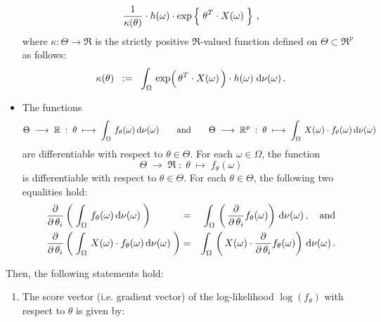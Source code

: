 \begin{theorem}
\begin{itemize}
\begin{equation*}
		\dfrac{1}{\kappa(\theta)}
		\cdot
		h(\omega)
		\cdot
		\exp\left\{\; \theta^{T} \!\overset{{\color{white}-}}{\cdot}\! X(\omega) \;\right\}\,,
	\end{equation*}
	where $\kappa : \Theta \longrightarrow \Re$ is the strictly positive
	$\Re$-valued function defined on $\Theta \subset \Re^{p}$ as follows:
	\begin{equation*}
	\kappa(\theta)
	\;\; := \;\;
		\int_{\Omega}\,
			\exp\!\left(\,\theta^{T} \!\overset{{\color{white}-}}{\cdot}\! X(\omega)\,\right) \cdot h(\omega)
		\;\d\nu(\omega)\,.
	\end{equation*}
\item
	The functions
	\begin{equation*}
	\Theta \; \longrightarrow \; \mathbb{R}
	\; : \; \theta \; \longmapsto \; \int_{\Omega}\,f_{\theta}(\omega)\,\textnormal{d}\nu(\omega)
	\quad\quad\textnormal{and}\quad\quad
	\Theta \; \longrightarrow \; \mathbb{R}^{p}
	\; : \; \theta \; \longmapsto \; \int_{\Omega}\,X(\omega) \cdot f_{\theta}(\omega)\,\textnormal{d}\nu(\omega)
	\end{equation*}
	are differentiable with respect to $\theta \in \Theta$.
	For each $\omega \in \Omega$, the function
	\begin{equation*}
	\Theta \; \longrightarrow \; \Re
	\; : \; \theta \; \longmapsto \; f_{\theta}(\omega)
	\end{equation*}
	is differentiable with respect to $\theta \in \Theta$.
	For each $\theta \in \Theta$, the following two equalities hold:
	\begin{eqnarray*}
	\dfrac{\partial}{\partial\,\theta_{i}} \left(\; \int_{\Omega}\,f_{\theta}(\omega)\,\d\nu(\omega) \;\right)
	{\color{white}\;\cdot X(\omega)}
	&=&
	\int_{\Omega}\, \left(\,\dfrac{\partial}{\partial\,\theta_{i}} f_{\theta}(\omega)\right) \,\d\nu(\omega)\,,
	\quad\textnormal{and}
	\\
	\dfrac{\partial}{\partial\,\theta_{i}} \left(\; \int_{\Omega}\,X(\omega) \cdot f_{\theta}(\omega)\,\d\nu(\omega) \;\right)
	&=&
	\int_{\Omega}\, \left(\,X(\omega) \cdot \dfrac{\partial}{\partial\,\theta_{i}} f_{\theta}(\omega)\right) \,\d\nu(\omega)\,.
	\end{eqnarray*}
\end{itemize}
Then, the following statements hold:
\begin{enumerate}
\item\label{formulaScoreVector}
	The score vector (i.e. gradient vector) of the log-likelihood $\log(f_{\theta})$ with respect to $\theta$ is given by:
	\begin{equation*}

\end{equation*}
\end{enumerate}
\end{theorem}
